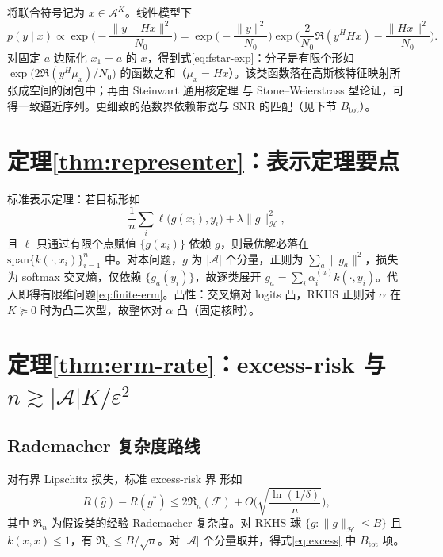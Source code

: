 将联合符号记为 $x\in\mathcal{A}^K$。线性模型下
\begin{equation}
p(y\mid x)
\propto
\exp\Big(
-\frac{\|y-Hx\|^2}{N_0}
\Big)
=
\exp\Big(
-\frac{\|y\|^2}{N_0}
\Big)
\exp\Big(
\frac{2}{N_0}\Re(y^H Hx)
-\frac{\|Hx\|^2}{N_0}
\Big).
\end{equation}
对固定 $a$ 边际化 $x_1=a$ 的 $x$，得到式\eqref{eq:fstar-exp}：分子是有限个形如
$\exp\big(2\Re(y^H \mu_x)/N_0\big)$ 的函数之和（$\mu_x=Hx$）。该类函数落在高斯核特征映射所张成空间的闭包中；再由 Steinwart 通用核定理\cite{steinwart2001} 与 Stone--Weierstrass 型论证，可得一致逼近序列。更细致的范数界依赖带宽与 SNR 的匹配（见下节 $B_{\mathrm{tot}}$）。

\section{定理\ref{thm:representer}：表示定理要点}

标准表示定理\cite{scholkopf2001}：若目标形如
\begin{equation}
\frac1n\sum_i \ell\big(g(x_i),y_i\big)+\lambda\|g\|_{\mathcal{H}}^2,
\end{equation}
且 $\ell$ 只通过有限个点赋值 $\{g(x_i)\}$ 依赖 $g$，则最优解必落在
$\mathrm{span}\{k(\cdot,x_i)\}_{i=1}^n$ 中。对本问题，$g$ 为 $|\mathcal{A}|$ 个分量，正则为 $\sum_a\|g_a\|^2$，损失为 softmax 交叉熵，仅依赖 $\{g_a(y_i)\}$，故逐类展开
$g_a=\sum_i\alpha_i^{(a)}k(\cdot,y_i)$。代入即得有限维问题\eqref{eq:finite-erm}。凸性：交叉熵对 logits 凸，RKHS 正则对 $\alpha$ 在 $K\succeq 0$ 时为凸二次型，故整体对 $\alpha$ 凸（固定核时）。

\section{定理\ref{thm:erm-rate}：excess-risk 与 $n\gtrsim|\mathcal{A}|K/\varepsilon^2$}

\subsection{Rademacher 复杂度路线}
对有界 Lipschitz 损失，标准 excess-risk 界\cite{bartlett2002} 形如
\begin{equation}
R(\hat g)-R(g^*)
\le
2\mathfrak{R}_n(\mathcal{F})
+O\Big(\sqrt{\frac{\ln(1/\delta)}{n}}\Big),
\end{equation}
其中 $\mathfrak{R}_n$ 为假设类的经验 Rademacher 复杂度。对 RKHS 球 $\{g:\|g\|_{\mathcal{H}}\le B\}$ 且 $k(x,x)\le 1$，有
$\mathfrak{R}_n\le B/\sqrt{n}$。对 $|\mathcal{A}|$ 个分量取并，得式\eqref{eq:excess} 中 $B_{\mathrm{tot}}$ 项。

